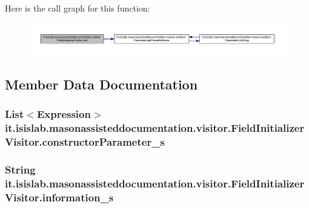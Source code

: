 Here is the call graph for this function\-:
\nopagebreak
\begin{figure}[H]
\begin{center}
\leavevmode
\includegraphics[width=350pt]{classit_1_1isislab_1_1masonassisteddocumentation_1_1visitor_1_1_field_initializer_visitor_acb95069b68c5f22706789201cd5645b6_cgraph}
\end{center}
\end{figure}




\subsection{Member Data Documentation}
\hypertarget{classit_1_1isislab_1_1masonassisteddocumentation_1_1visitor_1_1_field_initializer_visitor_abeb9a316d533f971cc30bfe5af74f3ad}{
\subsubsection[{constructor\-Parameter\-\_\-s}]{\setlength{\rightskip}{0pt plus 5cm}List$<$Expression$>$ it.\-isislab.\-masonassisteddocumentation.\-visitor.\-Field\-Initializer\-Visitor.\-constructor\-Parameter\-\_\-s\hspace{0.3cm}{\ttfamily [private]}}}\label{classit_1_1isislab_1_1masonassisteddocumentation_1_1visitor_1_1_field_initializer_visitor_abeb9a316d533f971cc30bfe5af74f3ad}
\hypertarget{classit_1_1isislab_1_1masonassisteddocumentation_1_1visitor_1_1_field_initializer_visitor_aee70f4a93ab159d0895d6d37b0028144}{
\subsubsection[{information\-\_\-s}]{\setlength{\rightskip}{0pt plus 5cm}String it.\-isislab.\-masonassisteddocumentation.\-visitor.\-Field\-Initializer\-Visitor.\-information\-\_\-s\hspace{0.3cm}{\ttfamily [private]}}}\label{classit_1_1isislab_1_1masonassisteddocumentation_1_1visitor_1_1_field_initializer_visitor_aee70f4a93ab159d0895d6d37b0028144}
